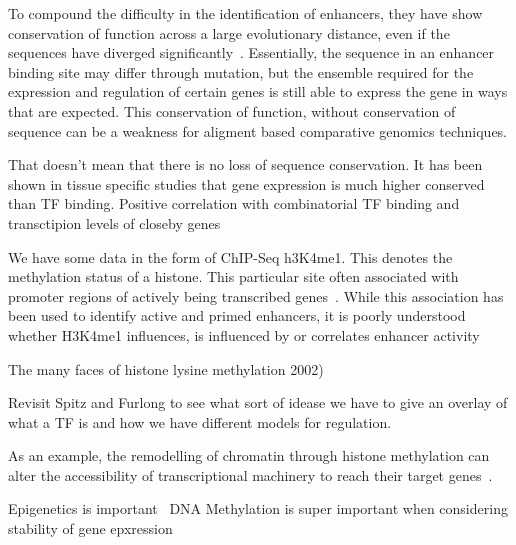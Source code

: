         
        
        To compound the difficulty in the identification of enhancers, they have show conservation of function across a large evolutionary distance, even if the sequences have diverged significantly~\cite{tautz2000evolution}. Essentially, the sequence in an enhancer binding site may differ through mutation, but the ensemble required for the expression and regulation of certain genes is still able to express the gene in ways that are expected. This conservation of function, without conservation of sequence can be a weakness for aligment based comparative genomics techniques. 
        
        
        
        
        That doesn't mean that there is no loss of sequence conservation. It has been shown in tissue specific studies that gene expression is much higher conserved than TF binding. Positive correlation with combinatorial TF binding and transctipion levels of closeby genes~\cite{wong2014decoupling}
        
        We have some data in the form of ChIP-Seq h3K4me1. This denotes the methylation status of a histone. This particular site often associated with promoter regions of actively being transcribed genes~\cite{barski2007high}. 
        While this association has been used to identify active and primed enhancers, it is poorly understood whether H3K4me1 influences, is influenced by or correlates enhancer activity~\cite{rada2018h3k4me1}
        
        The many faces of histone lysine methylation 2002)
        
        Revisit Spitz and Furlong to see what sort of idease we have to give an overlay of what a TF is and how we have different models for regulation. 
        
       
        
        
        
        As an example, the remodelling of chromatin through histone methylation can alter the accessibility of transcriptional machinery to reach their target genes~\cite{gibney2010epigenetics, holoch2015rna}. 
        
        Epigenetics is important~\cite{holliday2006epigenetics}
        DNA Methylation is super important when considering stability of gene epxression~\cite{jaenisch2003epigenetic}
        
